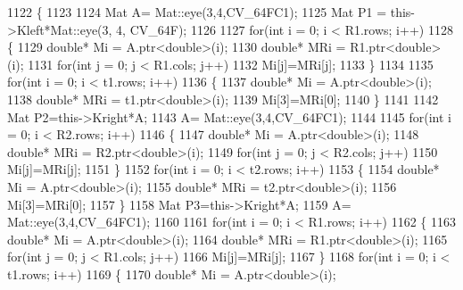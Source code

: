 \begin{DoxyCode}
1122                                                                                                            
                                 \{
1123 
1124     Mat A= Mat::eye(3,4,CV\_64FC1);
1125     Mat P1 = this->Kleft*Mat::eye(3, 4, CV\_64F);
1126 
1127     \textcolor{keywordflow}{for}(\textcolor{keywordtype}{int} i = 0; i < R1.rows; i++)
1128     \{
1129         \textcolor{keywordtype}{double}* Mi = A.ptr<\textcolor{keywordtype}{double}>(i);
1130         \textcolor{keywordtype}{double}* MRi = R1.ptr<\textcolor{keywordtype}{double}>(i);
1131         \textcolor{keywordflow}{for}(\textcolor{keywordtype}{int} j = 0; j < R1.cols; j++)
1132             Mi[j]=MRi[j];
1133     \}
1134 
1135     \textcolor{keywordflow}{for}(\textcolor{keywordtype}{int} i = 0; i < t1.rows; i++)
1136     \{
1137         \textcolor{keywordtype}{double}* Mi = A.ptr<\textcolor{keywordtype}{double}>(i);
1138         \textcolor{keywordtype}{double}* MRi = t1.ptr<\textcolor{keywordtype}{double}>(i);
1139         Mi[3]=MRi[0];
1140     \}
1141 
1142     Mat P2=this->Kright*A;
1143     A= Mat::eye(3,4,CV\_64FC1);
1144 
1145     \textcolor{keywordflow}{for}(\textcolor{keywordtype}{int} i = 0; i < R2.rows; i++)
1146     \{
1147         \textcolor{keywordtype}{double}* Mi = A.ptr<\textcolor{keywordtype}{double}>(i);
1148         \textcolor{keywordtype}{double}* MRi = R2.ptr<\textcolor{keywordtype}{double}>(i);
1149         \textcolor{keywordflow}{for}(\textcolor{keywordtype}{int} j = 0; j < R2.cols; j++)
1150             Mi[j]=MRi[j];
1151     \}
1152     \textcolor{keywordflow}{for}(\textcolor{keywordtype}{int} i = 0; i < t2.rows; i++)
1153     \{
1154         \textcolor{keywordtype}{double}* Mi = A.ptr<\textcolor{keywordtype}{double}>(i);
1155         \textcolor{keywordtype}{double}* MRi = t2.ptr<\textcolor{keywordtype}{double}>(i);
1156         Mi[3]=MRi[0];
1157     \}
1158     Mat P3=this->Kright*A;
1159     A= Mat::eye(3,4,CV\_64FC1);
1160 
1161     \textcolor{keywordflow}{for}(\textcolor{keywordtype}{int} i = 0; i < R1.rows; i++)
1162     \{
1163         \textcolor{keywordtype}{double}* Mi = A.ptr<\textcolor{keywordtype}{double}>(i);
1164         \textcolor{keywordtype}{double}* MRi = R1.ptr<\textcolor{keywordtype}{double}>(i);
1165         \textcolor{keywordflow}{for}(\textcolor{keywordtype}{int} j = 0; j < R1.cols; j++)
1166             Mi[j]=MRi[j];
1167     \}
1168     \textcolor{keywordflow}{for}(\textcolor{keywordtype}{int} i = 0; i < t1.rows; i++)
1169     \{
1170         \textcolor{keywordtype}{double}* Mi = A.ptr<\textcolor{keywordtype}{double}>(i);

\end{DoxyCode}
